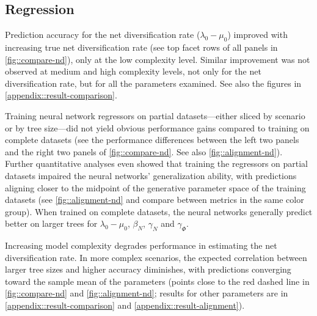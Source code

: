 {\subsection{Regression}
\label{ch3::sec::results::regression}
Prediction accuracy for the net diversification rate ($\lambda_0 - \mu_0$) improved with increasing true net diversification rate (see top facet rows of all panels in \autoref{fig::compare-nd}), only at the low complexity level. Similar improvement was not observed at medium and high complexity levels, not only for the net diversification rate, but for all the parameters examined. See also the figures in \autoref{appendix::result-comparison}. 

Training neural network regressors on partial datasets---either sliced by scenario or by tree size---did not yield obvious performance gains compared to training on complete datasets (see the performance differences between the left two panels and the right two panels of \autoref{fig::compare-nd}. See also \autoref{fig::alignment-nd}). Further quantitative analyses even showed that training the regressors on partial datasets impaired the neural networks' generalization ability, with predictions aligning closer to the midpoint of the generative parameter space of the training datasets (see \autoref{fig::alignment-nd} and compare between metrics in the same color group). When trained on complete datasets, the neural networks generally predict better on larger trees for $\lambda_0 - \mu_0$, $\beta_N$, $\gamma_N$ and $\gamma_\varPhi$.

Increasing model complexity degrades performance in estimating the net diversification rate. In more complex scenarios, the expected correlation between larger tree sizes and higher accuracy diminishes, with predictions converging toward the sample mean of the parameters (points close to the red dashed line in \autoref{fig::compare-nd} and \autoref{fig::alignment-nd}; results for other parameters are in \autoref{appendix::result-comparison} and \autoref{appendix::result-alignment}).

}
